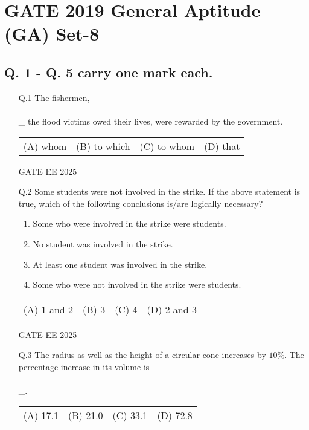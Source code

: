 \documentclass[journal]{IEEEtran}
\begin{document}
\section*{GATE 2019 General Aptitude (GA) Set-8}

\subsection*{Q. 1 - Q. 5 carry one mark each.}

\begin{enumerate}[leftmargin=*]
    \item[Q.1] The fishermen, \\\\\_ the flood victims owed their lives, were rewarded by the government.
    
    \begin{tabular}{llll}
        (A) whom & (B) to which & (C) to whom & (D) that
    \end{tabular}
    
    GATE EE 2025
   \vspace{0.5cm} 
    \item[Q.2] Some students were not involved in the strike. If the above statement is true, which of the following conclusions is/are logically necessary?
    
    \begin{enumerate}[label=(\arabic*)]
        \item Some who were involved in the strike were students.
        \item No student was involved in the strike.
        \item At least one student was involved in the strike.
        \item Some who were not involved in the strike were students.
    \end{enumerate}
     \vspace{0.5cm} 
    \begin{tabular}{llll}
        (A) 1 and 2 & (B) 3 & (C) 4 & (D) 2 and 3
    \end{tabular}
    
    GATE EE 2025
    
    \item[Q.3] The radius as well as the height of a circular cone increases by $10\%$. The percentage increase in its volume is \\\\\_.
    
    \begin{tabular}{llll}
        (A) 17.1 & (B) 21.0 & (C) 33.1 & (D) 72.8
    \end{tabular}
    

\end{enumerate}
\end{document}
